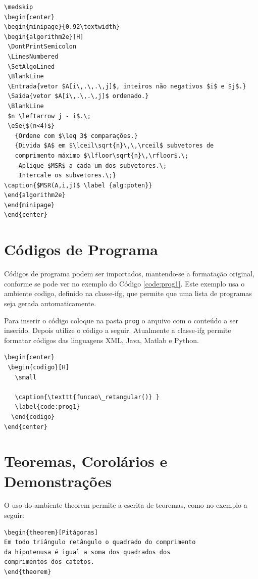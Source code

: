 \begin{verbatim}
\medskip
\begin{center}
\begin{minipage}{0.92\textwidth}
\begin{algorithm2e}[H]
 \DontPrintSemicolon
 \LinesNumbered
 \SetAlgoLined
 \BlankLine
 \Entrada{vetor $A[i\,.\,.\,j]$, inteiros não negativos $i$ e $j$.}
 \Saida{vetor $A[i\,.\,.\,j]$ ordenado.}
 \BlankLine
 $n \leftarrow j - i$.\;
 \eSe{$(n<4)$}
   {Ordene com $\leq 3$ comparações.}
   {Divida $A$ em $\lceil\sqrt{n}\,\,\rceil$ subvetores de 
   comprimento máximo $\lfloor\sqrt{n}\,\rfloor$.\;
    Aplique $MSR$ a cada um dos subvetores.\;
    Intercale os subvetores.\;}
\caption{$MSR(A,i,j)$ \label {alg:poten}}
\end{algorithm2e}
\end{minipage}
\end{center}
\end{verbatim}

\section{Códigos de Programa}
\label{sec:progs} 

Códigos de programa podem ser importados, mantendo-se a formatação original, conforme se pode ver no exemplo do Código \ref{code:prog1}. Este exemplo usa o ambiente \textsf{codigo}, definido na \textsf{classe-ifg}, que permite que uma lista de programas seja gerada automaticamente.

Para inserir o código coloque na pasta \verb|prog| o arquivo com o conteúdo a ser inserido. Depois utilize o código a seguir. Atualmente a \textsf{classe-ifg} permite formatar códigos das linguagens XML, Java, Matlab e Python.

\begin{verbatim}
\begin{center}
 \begin{codigo}[H]
   \small
   
   \caption{\texttt{funcao\_retangular()} }
   \label{code:prog1}
  \end{codigo}
\end{center}
\end{verbatim}

\section{Teoremas, Corolários e Demonstrações}
\label{sec:teor}
 O uso do ambiente \textsf{theorem} permite a escrita de teoremas, como no exemplo a seguir:
\begin{verbatim}
\begin{theorem}[Pitágoras]
Em todo triângulo retângulo o quadrado do comprimento
da hipotenusa é igual a soma dos quadrados dos
comprimentos dos catetos.
\end{theorem}
\end{verbatim}

